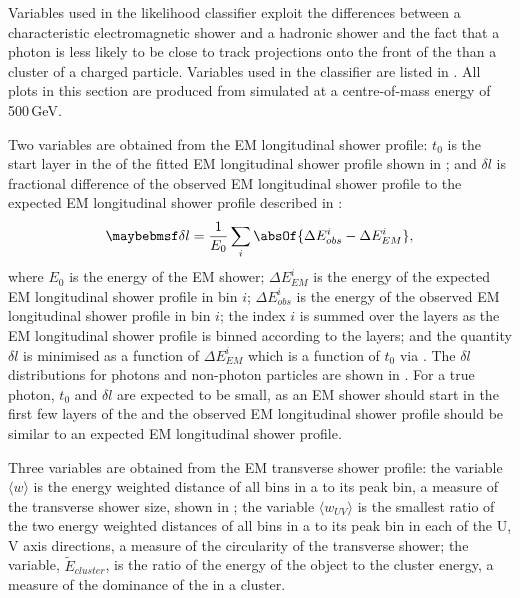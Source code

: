 Variables used in the likelihood classifier exploit the differences between a characteristic electromagnetic shower and a hadronic shower and the fact that a photon is less likely to be close to track projections onto the front of the \ECAL than a cluster of a charged particle. Variables used in the classifier are listed in . All plots in this section are produced from  simulated \eeZuds at a centre-of-mass energy of 500\,GeV.

Two variables are obtained from the EM longitudinal shower profile: $t_0$ is the start layer in the \ECAL of the fitted EM longitudinal shower profile shown in ; and $\delta{l}$ is fractional difference of the observed EM longitudinal shower profile to the expected EM longitudinal shower profile described in :
\begin{equation}
\delta l = \frac{1}{E_0}\sum_{i}^{}\absOf{\Delta E_{obs}^i - \Delta E_{EM}^i },
\end{equation}
where $E_0$ is the energy of the EM shower; $\Delta E_{EM}^i$ is the energy of the expected EM longitudinal shower profile in bin $i$;  $\Delta E_{obs}^i$ is the energy of the observed EM longitudinal shower profile in bin $i$; the index $i$ is summed over the \ECAL layers as the EM longitudinal shower profile is binned according to the \ECAL layers; and the quantity $\delta l$ is minimised as a function of $\Delta E_{EM}^i$ which is a  function of $t_0$ via  . The $\delta l$ distributions for photons and non-photon particles are shown in . For a true photon, $t_0$  and $\delta l $ are expected to be small, as an EM shower should start in the first few layers of the \ECAL and the observed EM longitudinal shower profile should be similar to an expected EM longitudinal shower profile.

Three variables are obtained from the EM transverse  shower profile: the variable $\langle{w}\rangle$ is the energy weighted \rms distance of all bins in a \ShowerPeak to its peak bin, a measure of the transverse shower size, shown in ; the variable ${\langle{w_{UV}}\rangle}$ is the smallest ratio of the two energy weighted \rms distances of all bins in a \ShowerPeak to its peak bin in each of the U, V axis directions, a measure of the circularity of the transverse shower; the variable, $\tilde{E}_{cluster}$, is the  ratio of the energy of the \ShowerPeak object to the cluster energy, a measure of the dominance of the \ShowerPeak in a cluster.

